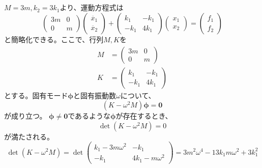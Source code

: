 \documentclass[a4paper]{jsarticle}
\begin{document}
\subsection{}
$M = 3m, k_2 = 3 k_1$より、運動方程式は
\begin{equation}
  \begin{pmatrix}
    3m & 0 \\
    0 & m
  \end{pmatrix}
  \begin{pmatrix}
    \ddot{x_1} \\
    \ddot{x_2}
  \end{pmatrix} +
  \begin{pmatrix}
    k_1 & -k_1 \\
    -k_1 & 4k_1
  \end{pmatrix}
  \begin{pmatrix}
    x_1 \\
    x_2
  \end{pmatrix} =
  \begin{pmatrix}
    f_1 \\
    f_2
  \end{pmatrix}
\end{equation}
と簡略化できる。ここで、行列$M, K$を
\begin{align}
  M &= 
  \begin{pmatrix}
    3m & 0 \\
    0 & m
  \end{pmatrix} \\
  K &=
  \begin{pmatrix}
    k_1 & -k_1 \\
    -k_1 & 4k_1
  \end{pmatrix}
\end{align}
とする。固有モード$\boldsymbol{\phi}$と固有振動数$\omega$について、
\begin{equation}
  (K - \omega^2 M) \boldsymbol{\phi} = \boldsymbol{0}
\end{equation}
が成り立つ。
$\boldsymbol{\phi} \neq \boldsymbol{0}$であるような$\boldsymbol{\phi}$が存在するとき、
\begin{equation}
  \det (K - \omega^2 M) = 0
\end{equation}
が満たされる。
\begin{equation}
  \det (K - \omega^2 M) = 
  \det
  \begin{pmatrix}
    k_1 - 3 m \omega^2 & -k_1 \\
    -k_1 & 4k_1 - m \omega^2
  \end{pmatrix} =
  3 m^2 \omega^4 - 13 k_1 m \omega^2 + 3 k_1^2
\end{equation}
\end{document}
